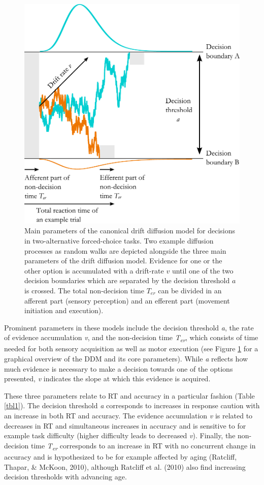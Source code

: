\documentclass[12pt,openany]{book}
\theoremstyle{definition}
\theoremstyle{definition}
\theoremstyle{definition}
\theoremstyle{remark}
\begin{document}
\begin{figure}
  \includegraphics{./figures/ddm.pdf}
  \caption{Main parameters of the canonical drift diffusion model for decisions in two-alternative forced-choice tasks. Two example diffusion processes as random walks are depicted alongside the three main parameters of the drift diffusion model. Evidence for one or the other option is accumulated with a drift-rate $v$ until one of the two decision boundaries which are separated by the decision threshold $a$ is crossed. The total non-decision time $T_{er}$ can be divided in an afferent part (sensory perception) and an efferent part (movement initiation and execution).\label{fig_ddm}}
\end{figure}

Prominent parameters in these models include the decision threshold
\emph{a}, the rate of evidence accumulation \emph{v}, and the
non-decision time \emph{T\textsubscript{er}}, which consists of time
needed for both sensory acquisition as well as motor execution (see
Figure \ref{fig_ddm} for a graphical overview of the DDM and its core
parameters). While \emph{a} reflects how much evidence is necessary to
make a decision towards one of the options presented, \emph{v} indicates
the slope at which this evidence is acquired.

These three parameters relate to RT and accuracy in a particular fashion
(Table \ref{tbl1}). The decision threshold \emph{a} corresponds to
increases in response caution with an increase in both RT and accuracy.
The evidence accumulation \emph{v} is related to decreases in RT and
simultaneous increases in accuracy and is sensitive to for example task
difficulty (higher difficulty leads to decreased \emph{v}). Finally, the
non-decision time \emph{T\textsubscript{er}} corresponds to an increase
in RT with no concurrent change in accuracy and is hypothesized to be
for example affected by aging (Ratcliff, Thapar, \& McKoon, 2010),
although Ratcliff et al. (2010) also find increasing decision thresholds
with advancing age.
\end{document}
